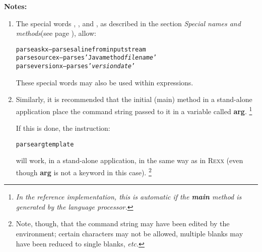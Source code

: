 \textbf{Notes:}
\begin{enumerate}
\item 
The special words , , and ,
as described in the section  \emph{Special names and methods}(see page \pageref{refspecial}), allow:
\begin{alltt}
parse ask x     -- parses a line from input stream
parse source x  -- parses 'Java method \emph{filename}'
parse version x -- parses '\nr{} \emph{version} \emph{date}'
\end{alltt}
These special words may also be used within expressions.
\item 
Similarly, it is recommended that the initial (main) method in a
stand-alone application place the command string passed to it in a
variable called \textbf{arg}.
\footnote{
\emph{In the reference implementation, this is automatic if
the \textbf{main} method is generated by the \nr{} language
processor.}
}
 
If this is done, the instruction:
\begin{alltt}
parse arg template
\end{alltt}
will work, in a stand-alone application, in the same way as in R\textsc{exx}
(even though \textbf{arg} is not a keyword in this case).
\footnote{
Note, though, that the command string may have been edited by the
environment; certain characters may not be allowed, multiple blanks may
have been reduced to single blanks, \emph{etc.}
}
\end{enumerate}
